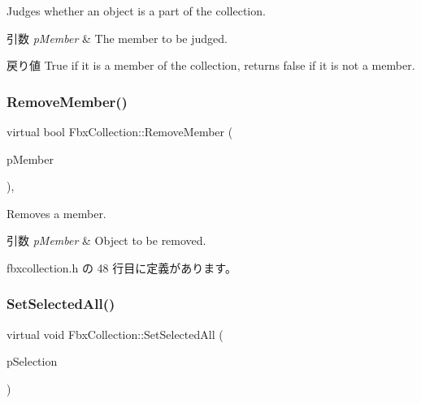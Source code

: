 Judges whether an object is a part of the collection. 
\begin{DoxyParams}{引数}
{\em p\+Member} & The member to be judged. \\
\hline
\end{DoxyParams}
\begin{DoxyReturn}{戻り値}
{\ttfamily True} if it is a member of the collection, returns {\ttfamily false} if it is not a member. 
\end{DoxyReturn}
\mbox{\label{class_fbx_collection_a8a65c60bae5ebfcd19f4aaad99ec10f1}} 
\subsubsection{\texorpdfstring{Remove\+Member()}{RemoveMember()}}
{\footnotesize\ttfamily virtual bool Fbx\+Collection\+::\+Remove\+Member (\begin{DoxyParamCaption}\item[{\hyperlink{class_fbx_object}{Fbx\+Object} $\ast$}]{p\+Member }\end{DoxyParamCaption})\hspace{0.3cm}{\ttfamily [inline]}, {\ttfamily [virtual]}}

Removes a member. 
\begin{DoxyParams}{引数}
{\em p\+Member} & Object to be removed. \\
\hline
\end{DoxyParams}


 fbxcollection.\+h の 48 行目に定義があります。

\mbox{\label{class_fbx_collection_a93caba5f2a0bded8cb00fca4001950e9}} 
\subsubsection{\texorpdfstring{Set\+Selected\+All()}{SetSelectedAll()}}
{\footnotesize\ttfamily virtual void Fbx\+Collection\+::\+Set\+Selected\+All (\begin{DoxyParamCaption}\item[{bool}]{p\+Selection }\end{DoxyParamCaption})\hspace{0.3cm}{\ttfamily [virtual]}}

